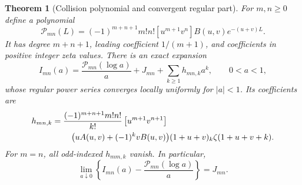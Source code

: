 \documentclass[11pt]{article}
\numberwithin{equation}{section}
\newtheorem{theorem}{Theorem}[section]
\theoremstyle{definition}
\theoremstyle{remark}
\newcommand{\coeff}[1]{\left[#1\right]}
\begin{document}
\begin{theorem}[Collision polynomial and convergent regular part]
\label{thm:collision}
For $m,n\ge0$ define a polynomial
\begin{equation}
 \mathcal P_{mn}(L)=(-1)^{m+n+1}m!n!
       \coeff{u^{m+1}v^n}B(u,v)e^{-(u+v)L}.
 \label{eq:collision-polynomial}
\end{equation}
It has degree $m+n+1$, leading coefficient $1/(m+1)$, and coefficients
in positive integer zeta values. There is an exact expansion
\begin{equation}
 I_{mn}(a)=\frac{\mathcal P_{mn}(\log a)}a
                +J_{mn}+\sum_{k\ge1}h_{mn,k}a^k,
 \qquad 0<a<1,
 \label{eq:collision-series}
\end{equation}
whose regular power series converges locally uniformly for $|a|<1$.
Its coefficients are
\begin{align}
 h_{mn,k}={}&\frac{(-1)^{m+n+1}m!n!}{k!}
 \coeff{u^{m+1}v^{n+1}}\notag\\
 &\quad\bigl(uA(u,v)+(-1)^kvB(u,v)\bigr)
               (1+u+v)_k\zeta(1+u+v+k).
 \label{eq:collision-coefficients}
\end{align}
For $m=n$, all odd-indexed $h_{mm,k}$ vanish. In particular,
\begin{equation}
 \lim_{a\downarrow0}\left\{I_{mn}(a)
             -\frac{\mathcal P_{mn}(\log a)}a\right\}=J_{mn}.
 \label{eq:collision-limit}
\end{equation}
\end{theorem}
\end{document}
